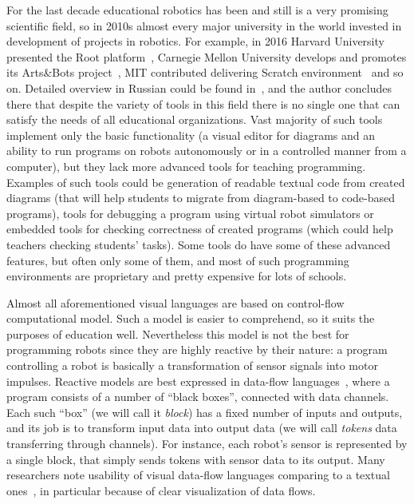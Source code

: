 \documentclass[conference]{IEEEtran}
\begin{document}
For the last decade educational robotics has been and still is a very promising scientific field, so in 2010s almost every major university in the world invested in development of projects in robotics. For example, in 2016 Harvard University presented the Root platform~\cite{root}, Carnegie Mellon University develops and promotes its Arts\&Bots project~\cite{cross2013visual}, MIT contributed delivering Scratch environment~\cite{resnick2009scratch} and so on. Detailed overview in Russian could be found in~\cite{mordvinov2016NONPUBLISHED}, and the author concludes there that despite the variety of tools in this field there is no single one that can satisfy the needs of all educational organizations. Vast majority of such tools implement only the basic functionality (a visual editor for diagrams and an ability to run programs on robots autonomously or in a controlled manner from a computer), but they lack more advanced tools for teaching programming. Examples of such tools could be generation of readable textual code from created diagrams (that will help students to migrate from diagram-based to code-based programs), tools for debugging a program using virtual robot simulators or embedded tools for checking correctness of created programs (which could help teachers checking students' tasks). Some tools do have some of these advanced features, but often only some of them, and most of such programming environments are proprietary and pretty expensive for lots of schools.

Almost all aforementioned visual languages are based on control-flow computational model. Such a model is easier to comprehend, so it suits the purposes of education well. Nevertheless this model is not the best for programming robots since they are highly reactive by their nature: a program controlling a robot is basically a transformation of sensor signals into motor impulses. Reactive models are best expressed in data-flow languages~\cite{johnston2004advances}, where a program consists of a number of ``black boxes'', connected with data channels. Each such ``box'' (we will call it \emph{block}) has a fixed number of inputs and outputs, and its job is to transform input data into output data (we will call \emph{tokens} data transferring through channels). For instance, each robot's sensor is represented by a single block, that simply sends tokens with sensor data to its output. Many researchers note usability of visual data-flow languages comparing to a textual ones~\cite{johnston2004advances}, in particular because of clear visualization of data flows.
\end{document}
